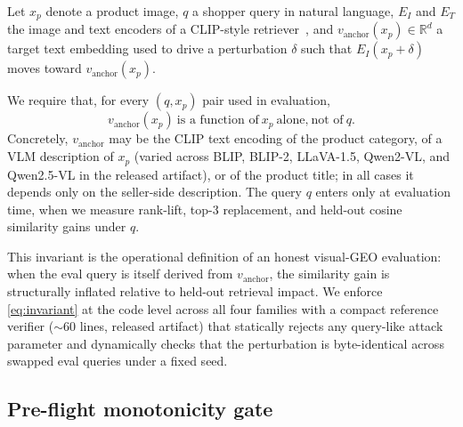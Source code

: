 Let $x_p$ denote a product image, $q$ a shopper query in natural language, $E_I$ and $E_T$ the image and text encoders of a CLIP-style retriever~\cite{radford2021clip,jia2021scaling,cherti2023reproducible}, and $v_{\text{anchor}}(x_p) \in \mathbb{R}^d$ a target text embedding used to drive a perturbation $\delta$ such that $E_I(x_p + \delta)$ moves toward $v_{\text{anchor}}(x_p)$.

We require that, for every $(q, x_p)$ pair used in evaluation,
\begin{equation}
v_{\text{anchor}}(x_p)\ \text{is a function of}\ x_p\ \text{alone,}\ \text{not of}\ q.
\label{eq:invariant}
\end{equation}
Concretely, $v_{\text{anchor}}$ may be the CLIP text encoding of the product category, of a VLM description of $x_p$ (varied across BLIP, BLIP-2, LLaVA-1.5, Qwen2-VL, and Qwen2.5-VL in the released artifact), or of the product title; in all cases it depends only on the seller-side description. The query $q$ enters only at evaluation time, when we measure rank-lift, top-3 replacement, and held-out cosine similarity gains under $q$.

This invariant is the operational definition of an honest visual-GEO evaluation: when the eval query is itself derived from $v_{\text{anchor}}$, the similarity gain is structurally inflated relative to held-out retrieval impact. We enforce \eqref{eq:invariant} at the code level across all four families with a compact reference verifier ($\sim$60 lines, released artifact) that statically rejects any query-like attack parameter and dynamically checks that the perturbation is byte-identical across swapped eval queries under a fixed seed.

\subsection{Pre-flight monotonicity gate}
\label{sec:method:noop}

